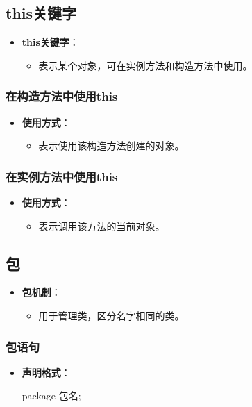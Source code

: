 \documentclass[a4paper, 10pt]{ctexart}
\begin{document}
\subsection{this关键字}
\begin{itemize}
  \item \textbf{this关键字}：
  \begin{itemize}
    \item 表示某个对象，可在实例方法和构造方法中使用。
  \end{itemize}
\end{itemize}

\subsubsection{在构造方法中使用this}
\begin{itemize}
  \item \textbf{使用方式}：
  \begin{itemize}
    \item 表示使用该构造方法创建的对象。
  \end{itemize}
\end{itemize}

\subsubsection{在实例方法中使用this}
\begin{itemize}
  \item \textbf{使用方式}：
  \begin{itemize}
    \item 表示调用该方法的当前对象。
  \end{itemize}
\end{itemize}

\subsection{包}
\begin{itemize}
  \item \textbf{包机制}：
  \begin{itemize}
    \item 用于管理类，区分名字相同的类。
  \end{itemize}
\end{itemize}

\subsubsection{包语句}
\begin{itemize}
  \item \textbf{声明格式}：
  \begin{codeblock}
package 包名;
  \end{codeblock}
\end{itemize}
\end{document}

